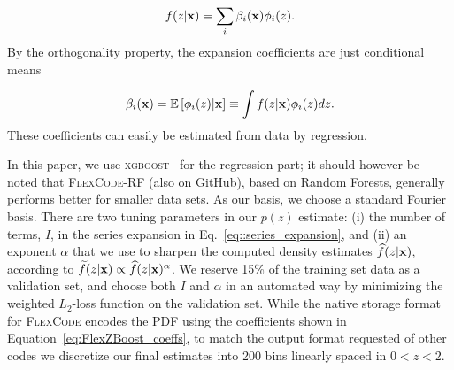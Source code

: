 \begin{equation}
f(z|{\mathbf{x}})=\sum_{i}\beta_{i }({\mathbf{x}})\phi_i(z). \label{eq::series_expansion}
\end{equation}
By the orthogonality property, the expansion coefficients are just conditional means

\begin{equation}
\beta_{i }({\mathbf{x}}) =  \mathbb{E}\left[\phi_i(z)|{\mathbf{x}}\right] \equiv \int f(z|{\mathbf{x}})   \phi_i(z) dz. \label{eq:FlexZBoost_coeffs}
\end{equation}
These coefficients can easily be estimated from data by regression.

In this paper, we use \textsc{xgboost}~\citep{Chen:16} for the regression part; it should however be noted that \textsc{FlexCode-RF} (also on GitHub), based on Random Forests, generally performs better for smaller data sets. As our basis, we choose a standard Fourier basis. There are two tuning parameters in our $p(z)$ estimate: (i) the number of terms, $I$, in the series expansion in Eq.~\ref{eq::series_expansion}, and (ii) an exponent $\alpha$ that we use to sharpen the computed density estimates $\widehat{f}(z|{\mathbf{x}})$, according to $\widetilde{f}(z|{\mathbf{x}}) \propto \widehat{f}(z|{\mathbf{x}})^\alpha$.  We reserve 15\% of the training set data as a validation set, and choose both $I$ and $\alpha$ in an automated way by minimizing the weighted $L_2$-loss function \citep[Eq. 5 in][]{Izbicki:17} on the  validation set.  While the native storage format for \textsc{FlexCode} encodes the PDF using the coefficients shown in Equation~\ref{eq:FlexZBoost_coeffs}, to match the output format requested of other codes we discretize our final estimates into 200 bins linearly spaced in $0 < z < 2$.





%
%

